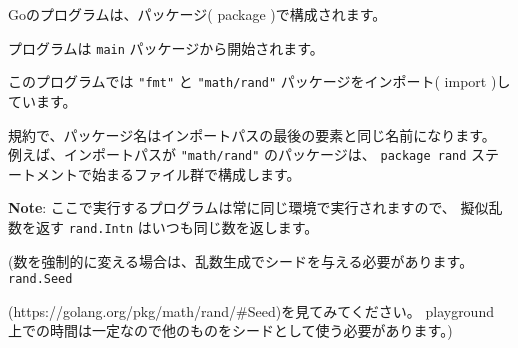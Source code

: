 Goのプログラムは、パッケージ( package )で構成されます。

プログラムは \texttt{main} パッケージから開始されます。

このプログラムでは \texttt{"fmt"} と \texttt{"math/rand"} パッケージをインポート( import )しています。

規約で、パッケージ名はインポートパスの最後の要素と同じ名前になります。
例えば、インポートパスが \texttt{"math/rand"} のパッケージは、
\texttt{package rand} ステートメントで始まるファイル群で構成します。

\textbf{Note}: ここで実行するプログラムは常に同じ環境で実行されますので、
擬似乱数を返す \texttt{rand.Intn} はいつも同じ数を返します。

(数を強制的に変える場合は、乱数生成でシードを与える必要があります。
\texttt{rand.Seed}

(https:\//\//golang.org\//pkg\//math\//rand\//\#Seed)を見てみてください。
playground 上での時間は一定なので他のものをシードとして使う必要があります。)
